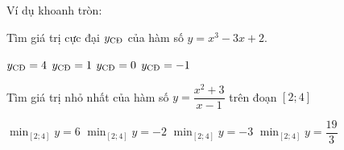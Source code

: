 \documentclass[a4paper,11pt]{exam}
\newcommand*\circled[1]{\tikz[baseline=(char.base)]{
            \node[shape=circle,draw,inner sep=1pt] (char) {\small #1};}}
\begin{document}
Ví dụ khoanh tròn: \circled{A}
\setlength{\multicolsep}{0.2em}
\begin{questions}
\question Tìm giá trị cực đại $y_{\tiny\text{CĐ}}$ của hàm số $y=x^3-3x+2$.
\begin{multicols}{2} \begin{choices}
\choice $y_{\tiny\text{CĐ}}=4$
\choice $y_{\tiny\text{CĐ}}=1$
\choice $y_{\tiny\text{CĐ}}=0$
\choice $y_{\tiny\text{CĐ}}=-1$
\end{choices} \end{multicols}
\question Tìm giá trị nhỏ nhất của hàm số $y=\dfrac{x^2+3}{x-1}$ trên đoạn $[2;4]$
\begin{multicols}{2} \begin{choices}
\choice $\min_{[2;4]} y=6$
\choice $\min_{[2;4]} y=-2$
\choice $\min_{[2;4]} y=-3$
\choice $\min_{[2;4]} y=\dfrac{19}{3}$
\end{choices} \end{multicols}
\end{questions}
\end{document}
